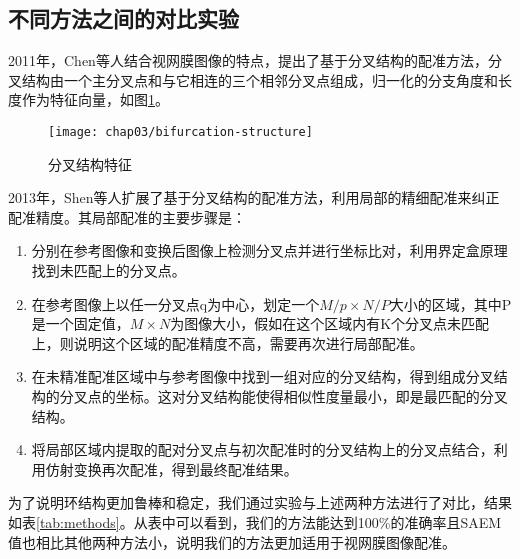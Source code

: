 \subsection{不同方法之间的对比实验}

2011年，Chen\cite{chen2011retinal,chen2015retinal}等人结合视网膜图像的特点，提出了基于分叉结构的配准方法，分叉结构由一个主分叉点和与它相连的三个相邻分叉点组成，归一化的分支角度和长度作为特征向量，如图\ref{fig:bifurcation structure}。

\begin{figure}[!ht]
  \centering
  \texttt{[image: chap03/bifurcation-structure]}
  \caption{分叉结构特征}
  \label{fig:bifurcation structure}
\end{figure}

2013年，Shen\cite{shen2012blood}等人扩展了基于分叉结构的配准方法，利用局部的精细配准来纠正配准精度。其局部配准的主要步骤是：
\begin{enumerate}
\item 分别在参考图像和变换后图像上检测分叉点并进行坐标比对，利用界定盒原理找到未匹配上的分叉点。
\item 在参考图像上以任一分叉点q为中心，划定一个$M / p \times N / P$大小的区域，其中P是一个固定值，$M \times N$为图像大小，假如在这个区域内有K个分叉点未匹配上，则说明这个区域的配准精度不高，需要再次进行局部配准。
\item 在未精准配准区域中与参考图像中找到一组对应的分叉结构，得到组成分叉结构的分叉点的坐标。这对分叉结构能使得相似性度量最小，即是最匹配的分叉结构。
\item 将局部区域内提取的配对分叉点与初次配准时的分叉结构上的分叉点结合，利用仿射变换再次配准，得到最终配准结果。
\end{enumerate}

为了说明环结构更加鲁棒和稳定，我们通过实验与上述两种方法进行了对比，结果如表\ref{tab:methods}。从表中可以看到，我们的方法能达到100\%的准确率且SAEM值也相比其他两种方法小，说明我们的方法更加适用于视网膜图像配准。


